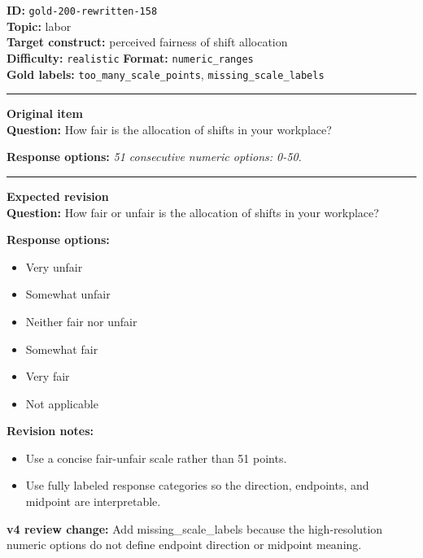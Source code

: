\documentclass[10pt,a4paper]{article}
\newcommand{\sectionline}{\vspace{0.15em}\hrule\vspace{0.35em}}
\begin{document}
\begin{tcolorbox}[colframe=FlawRed,colback=white,colbacktitle=FlawRed!9,coltitle=black,title={Item 158\hfill Flawed item}]
\textbf{ID:} \texttt{gold-200-rewritten-158}\\
\textbf{Topic:} labor\\
\textbf{Target construct:} perceived fairness of shift allocation\\
\textbf{Difficulty:} \texttt{realistic} \quad \textbf{Format:} \texttt{numeric\_ranges}\\
\textbf{Gold labels:} \texttt{too\_many\_scale\_points}, \texttt{missing\_scale\_labels}\\
\sectionline
\textbf{Original item}\\
\textbf{Question:} How fair is the allocation of shifts in your workplace?
\par\textbf{Response options:}
\textit{51 consecutive numeric options: 0-50.}
\sectionline
\textbf{Expected revision}\\
\textbf{Question:} How fair or unfair is the allocation of shifts in your workplace?
\par\textbf{Response options:}
\begin{itemize}
\item Very unfair
\item Somewhat unfair
\item Neither fair nor unfair
\item Somewhat fair
\item Very fair
\item Not applicable
\end{itemize}
\par\textbf{Revision notes:}
\begin{itemize}
\item Use a concise fair-unfair scale rather than 51 points.
\item Use fully labeled response categories so the direction, endpoints, and midpoint are interpretable.
\end{itemize}
\par\textbf{v4 review change:} Add missing\_scale\_labels because the high-resolution numeric options do not define endpoint direction or midpoint meaning.
\end{tcolorbox}
\end{document}

